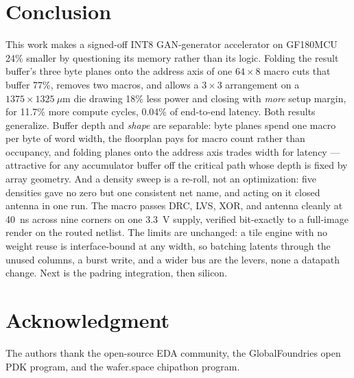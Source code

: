 \documentclass[conference,a4paper]{APSIPA2026}
\begin{document}
\section{Conclusion}\label{sec:concl}
This work makes a signed-off INT8 GAN-generator accelerator on GF180MCU 24\% smaller by questioning its memory rather than its logic. Folding the result buffer's three byte planes onto the address axis of one $64\times8$ macro cuts that buffer 77\%, removes two macros, and allows a $3\times3$ arrangement on a $1375\times1325~\mu$m die drawing 18\% less power and closing with \emph{more} setup margin, for 11.7\% more compute cycles, 0.04\% of end-to-end latency. Both results generalize. Buffer depth and \emph{shape} are separable: byte planes spend one macro per byte of word width, the floorplan pays for macro count rather than occupancy, and folding planes onto the address axis trades width for latency --- attractive for any accumulator buffer off the critical path whose depth is fixed by array geometry. And a density sweep is a re-roll, not an optimization: five densities gave no zero but one consistent net name, and acting on it closed antenna in one run. The macro passes DRC, LVS, XOR, and antenna cleanly at 40~ns across nine corners on one 3.3~V supply, verified bit-exactly to a full-image render on the routed netlist. The limits are unchanged: a tile engine with no weight reuse is interface-bound at any width, so batching latents through the unused columns, a burst write, and a wider bus are the levers, none a datapath change. Next is the padring integration, then silicon.

\section*{Acknowledgment}
The authors thank the open-source EDA community, the GlobalFoundries open PDK program, and the wafer.space chipathon program.
\end{document}
